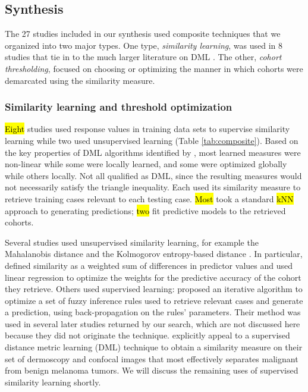 \documentclass[sn-mathphys,Numbered,pdflatex]{sn-jnl}
\theoremstyle{remark}
\theoremstyle{definition}
\begin{document}
\subsection{Synthesis}\label{synthesis-1}

The 27 studies included in our synthesis used composite techniques that
we organized into two major types. One type, \emph{similarity learning},
was used in 8 studies that tie in to the much larger literature on DML
\citep{Yang2006}. The other, \emph{cohort thresholding}, focused on
choosing or optimizing the manner in which cohorts were demarcated using
the similarity measure.

\subsubsection{Similarity learning and threshold
optimization}\label{similarity-learning-and-threshold-optimization}

\hl{Eight} studies used response values in training data sets to
supervise similarity learning while two used unsupervised learning
(Table \ref{tab:composite}). Based on the key properties of DML
algorithms identified by \citet{Bellet2014}, most learned measures were
non-linear while some were locally learned, and some were optimized
globally while others locally. Not all qualified as DML, since the
resulting measures would not necessarily satisfy the triangle
inequality. Each used its similarity measure to retrieve training cases
relevant to each testing case. \hl{Most} took a standard \hl{kNN}
approach to generating predictions; \hl{two}
\citep{Vilhena2016, Tang2021} fit predictive models to the retrieved
cohorts.

Several studies used unsupervised similarity learning, for example the
Mahalanobis distance \citep{Lowsky2013} and the Kolmogorov entropy-based
distance \citep{Elter2007}. In particular, \citet{Yearwood1997} defined
similarity as a weighted sum of differences in predictor values and used
linear regression to optimize the weights for the predictive accuracy of
the cohort they retrieve. Others used supervised learning:
\citet{Song2006} proposed an iterative algorithm to optimize a set of
fuzzy inference rules used to retrieve relevant cases and generate a
prediction, using back-propagation on the rules' parameters. Their
method was used in several later studies returned by our search, which
are not discussed here because they did not originate the technique.
\citet{Nicolas2014} explicitly appeal to a supervised distance metric
learning (DML) technique \citep{Xing2002} to obtain a similarity measure
on their set of dermoscopy and confocal images that most effectively
separates malignant from benign melanoma tumors. We will discuss the
remaining uses of supervised similarity learning shortly.
\end{document}
